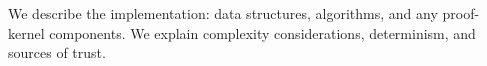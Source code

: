 We describe the implementation: data structures, algorithms, and any proof-kernel components. We explain complexity considerations, determinism, and sources of trust.

